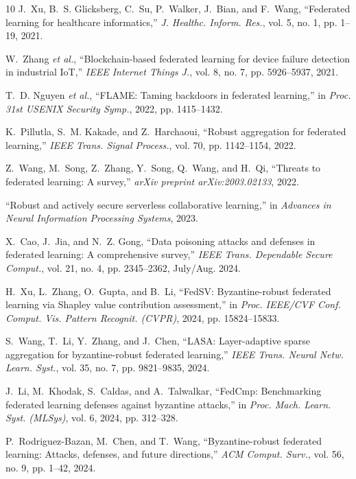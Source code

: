 \documentclass[12pt,a4paper,onecolumn]{article}
\begin{document}
\begin{thebibliography}{10}
J.~Xu, B.~S. Glicksberg, C.~Su, P.~Walker, J.~Bian, and F.~Wang,
``Federated learning for healthcare informatics,''
\emph{J. Healthc. Inform. Res.}, vol. 5, no. 1, pp. 1--19, 2021.

W.~Zhang \emph{et al.},
``Blockchain-based federated learning for device failure detection in industrial IoT,''
\emph{IEEE Internet Things J.}, vol. 8, no. 7, pp. 5926--5937, 2021.

T.~D. Nguyen \emph{et al.},
``FLAME: Taming backdoors in federated learning,''
in \emph{Proc. 31st USENIX Security Symp.}, 2022, pp. 1415--1432.

K.~Pillutla, S.~M. Kakade, and Z.~Harchaoui,
``Robust aggregation for federated learning,''
\emph{IEEE Trans. Signal Process.}, vol. 70, pp. 1142--1154, 2022.

Z.~Wang, M.~Song, Z.~Zhang, Y.~Song, Q.~Wang, and H.~Qi,
``Threats to federated learning: A survey,''
\emph{arXiv preprint arXiv:2003.02133}, 2022.

``Robust and actively secure serverless collaborative learning,''
in \emph{Advances in Neural Information Processing Systems}, 2023.

X.~Cao, J.~Jia, and N.~Z. Gong,
``Data poisoning attacks and defenses in federated learning: A comprehensive survey,''
\emph{IEEE Trans. Dependable Secure Comput.}, vol. 21, no. 4, pp. 2345--2362, July/Aug. 2024.

H.~Xu, L.~Zhang, O.~Gupta, and B.~Li,
``FedSV: Byzantine-robust federated learning via Shapley value contribution assessment,''
in \emph{Proc. IEEE/CVF Conf. Comput. Vis. Pattern Recognit. (CVPR)}, 2024, pp. 15824--15833.

S.~Wang, T.~Li, Y.~Zhang, and J.~Chen,
``LASA: Layer-adaptive sparse aggregation for byzantine-robust federated learning,''
\emph{IEEE Trans. Neural Netw. Learn. Syst.}, vol. 35, no. 7, pp. 9821--9835, 2024.

J.~Li, M.~Khodak, S.~Caldas, and A.~Talwalkar,
``FedCmp: Benchmarking federated learning defenses against byzantine attacks,''
in \emph{Proc. Mach. Learn. Syst. (MLSys)}, vol. 6, 2024, pp. 312--328.

P.~Rodriguez-Bazan, M.~Chen, and T.~Wang,
``Byzantine-robust federated learning: Attacks, defenses, and future directions,''
\emph{ACM Comput. Surv.}, vol. 56, no. 9, pp. 1--42, 2024.


\end{thebibliography}
\end{document}

